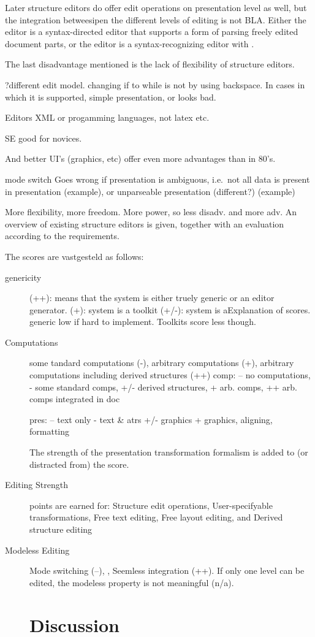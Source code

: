 Later structure editors do offer edit operations on presentation level as well, but the integration betweesipen the different levels of editing is not BLA. Either the editor is a syntax-directed editor that supports a form of parsing freely edited document parts, or the editor is a syntax-recognizing editor with .  



The last disadvantage mentioned is the lack of flexibility of structure editors.  

?different edit model. changing if to while is not by using backspace. In cases in which it is supported, simple presentation, or looks bad.

Editors XML or progamming languages, not latex etc.

SE good for novices.

And better UI's (graphics, etc) offer even more advantages than in 80's. 


mode switch Goes wrong if presentation is ambiguous, i.e.\ not all data is present in presentation (example), or unparseable presentation (different?) (example)


More flexibility, more freedom. More power, so less disadv. and more adv.
 An overview of existing structure editors is given, together with an evaluation according to the requirements. 


The scores are vastgesteld as follows:

\begin{description}
\item[genericity]
(++): means that the system is either truely generic or an editor generator. 
(+): system is a toolkit
(+/-): system is aExplanation of scores.
generic low if hard to implement. Toolkits score less though.

\item[Computations] some tandard computations (-), arbitrary computations (+), arbitrary computations including derived structures (++) 
comp: -- no computations, - some standard comps, +/- derived structures, +  arb. comps, ++ arb. comps integrated in doc

pres: -- text only - text \& atrs +/- graphics + graphics, aligning, formatting
 
The strength of the presentation transformation formalism is added to (or distracted from) the score.
\item[Editing Strength] points are earned for: Structure edit operations, User-specifyable transformations, Free text editing, Free layout editing, and Derived structure editing
\item[Modeless Editing] Mode switching (--), , Seemless integration (++). If only one level can be edited, the modeless property is not meaningful (n/a).
\section{Discussion}
\end{description}







